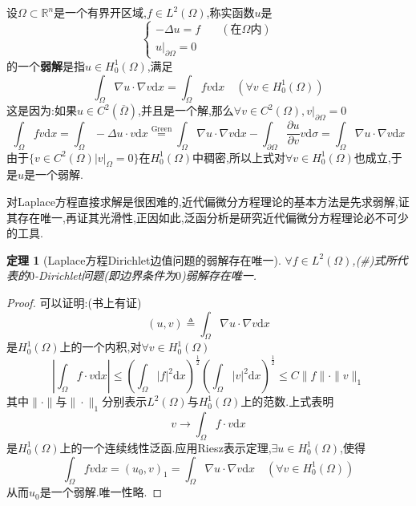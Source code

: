 \documentclass[12pt,a4paper]{article}
\newtheorem{thm}{定理}[subsection]  %
\begin{document}
设$\Omega\subset \mathbb{R}^n$是一个有界开区域,$f\in L^2(\Omega)$,称实函数$u$是
\begin{equation}\begin{cases}
    -\Delta u = f &\quad (\text{在}\Omega \text{内})\\u|_{\partial \Omega} = 0&
\end{cases}\tag{\#} \end{equation}
的一个\textbf{弱解}是指$u \in H_0^1(\Omega)$,满足
\[\int_{\Omega} \nabla u \cdot \nabla v \mathrm{d}x = \int_{\Omega}fv\mathrm{d}x \quad (\forall v \in H_0^1(\Omega))\]
这是因为:如果$u \in C^2(\overline{\Omega})$,并且是一个解,那么$\forall v \in C^2(\Omega),v|_{\partial \Omega} = 0$
\[\int_{\Omega}fv\mathrm{d}x = \int_{\Omega}-\Delta u \cdot v\mathrm{d}x 
\overset{\mathrm{Green}}{=} \int_{\Omega}\nabla u \cdot \nabla v \mathrm{d}x - \int_{\partial \Omega} \frac{\partial u}{\partial v} v \mathrm{d}\sigma
= \int_{\Omega}\nabla u \cdot \nabla v \mathrm{d}x\]
由于$\{v \in C^2(\Omega)|v|_{\Omega} = 0\}$在$H_0^1(\Omega)$中稠密,所以上式对$\forall v\in H_0^1(\Omega)$也成立,于是$u$是一个弱解.


对Laplace方程直接求解是很困难的,近代偏微分方程理论的基本方法是先求弱解,证其存在唯一,再证其光滑性,正因如此,泛函分析是研究近代偏微分方程理论必不可少的工具.
\begin{thm}[Laplace方程Dirichlet边值问题的弱解存在唯一]
    $\forall f \in L^2(\Omega)$,(\#)式所代表的$0$-Dirichlet问题(即边界条件为$0$)弱解存在唯一.
\end{thm}
\begin{proof}
    可以证明:(书上有证)\[(u,v) \triangleq \int_{\Omega} \nabla u \cdot \nabla v \mathrm{d}x\]
    是$H_0^1(\Omega)$上的一个内积,对$\forall v \in H_0^1(\Omega)$
    \[|\int_{\Omega}f\cdot v \mathrm{d}x|\leq (\int_{\Omega}|f|^2\mathrm{d}x)^{\frac{1}{2}} (\int_{\Omega}|v|^2\mathrm{d}x)^{\frac{1}{2}}
    \leq C \|f\|\cdot \|v\|_1\]
    其中$\|\cdot\|$与$\|\cdot\|_1$分别表示$L^2(\Omega)$与$H_0^1(\Omega)$上的范数.上式表明
    \[v \to \int_{\Omega}f\cdot v \mathrm{d}x\]
    是$H_0^1(\Omega)$上的一个连续线性泛函.应用Riesz表示定理,$\exists u \in H_0^1(\Omega)$,使得
    \[\int_{\Omega}fv\mathrm{d}x = (u_0,v)_1 = \int_{\Omega}\nabla u \cdot \nabla v\mathrm{d}x\quad (\forall v \in H_0^1(\Omega))\]
    从而$u_0$是一个弱解.唯一性略.
\end{proof}
\end{document}

